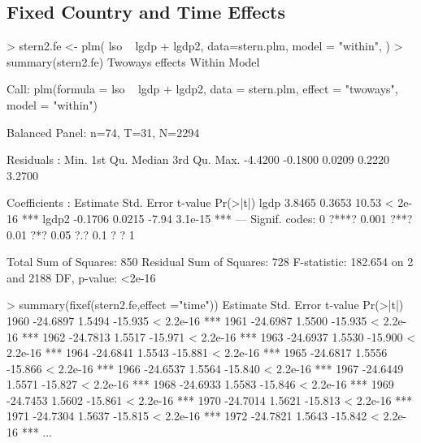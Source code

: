 \documentclass[landscape,letterpaper,9pt]{article}
\begin{document}
\newpage
\clearpage

\subsection{Fixed Country and Time Effects}
\begin{CVerbatim}
> stern2.fe <- plm( lso ~ lgdp  + lgdp2, data=stern.plm,  
       model = "within", \fbox{\textcolor{red}{effect = "twoways"}})
> summary(stern2.fe)
Twoways effects Within Model

Call:
plm(formula = lso ~ lgdp + lgdp2, data = stern.plm, effect = "twoways",
    model = "within")

Balanced Panel: n=74, T=31, N=2294

Residuals :
   Min. 1st Qu.  Median 3rd Qu.    Max.
-4.4200 -0.1800  0.0209  0.2220  3.2700

Coefficients :
      Estimate Std. Error t-value Pr(>|t|)
lgdp    3.8465     0.3653   10.53  < 2e-16 ***
lgdp2  -0.1706     0.0215   -7.94  3.1e-15 ***
---
Signif. codes:  0 ?***? 0.001 ?**? 0.01 ?*? 0.05 ?.? 0.1 ? ? 1

Total Sum of Squares:    850
Residual Sum of Squares: 728
F-statistic: 182.654 on 2 and 2188 DF, p-value: <2e-16
\end{CVerbatim}
\newpage
\begin{CVerbatim}
> summary(fixef(stern2.fe,effect ="time"))
     Estimate Std. Error t-value  Pr(>|t|)
1960 -24.6897     1.5494 -15.935 < 2.2e-16 ***
1961 -24.6987     1.5500 -15.935 < 2.2e-16 ***
1962 -24.7813     1.5517 -15.971 < 2.2e-16 ***
1963 -24.6937     1.5530 -15.900 < 2.2e-16 ***
1964 -24.6841     1.5543 -15.881 < 2.2e-16 ***
1965 -24.6817     1.5556 -15.866 < 2.2e-16 ***
1966 -24.6537     1.5564 -15.840 < 2.2e-16 ***
1967 -24.6449     1.5571 -15.827 < 2.2e-16 ***
1968 -24.6933     1.5583 -15.846 < 2.2e-16 ***
1969 -24.7453     1.5602 -15.861 < 2.2e-16 ***
1970 -24.7014     1.5621 -15.813 < 2.2e-16 ***
1971 -24.7304     1.5637 -15.815 < 2.2e-16 ***
1972 -24.7821     1.5643 -15.842 < 2.2e-16 ***
...
\end{CVerbatim}
\end{document}
